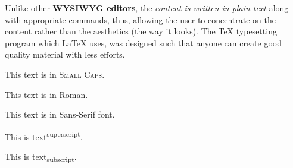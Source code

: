 \documentclass{article}
\begin{document}
	Unlike other \textbf{WYSIWYG editors}, the \emph{content is written in plain text} along with appropriate commands, thus, allowing the user to \underline{concentrate} on the content rather than the aesthetics (the way it looks). The {\Large TeX} typesetting program which LaTeX uses, was designed such that anyone can create good quality material with less efforts.
	
	This text is in \textsc{Small Caps}.
	
	This text is in \textrm{Roman}.
	
	This text is in \textsf{Sans-Serif font}.
	
	This is text\textsuperscript{superscript}.
	
	This is text\textsubscript{subscript}.
	
	\tiny
	\lipsum[1-2]
	
	\normalsize
	\lipsum[3-4]
\end{document}

